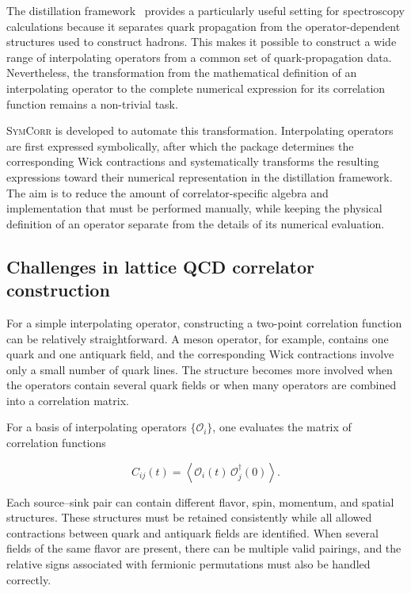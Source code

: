 \documentclass[11pt]{article}
\begin{document}
The distillation framework~\cite{Peardon:2009gh} provides a particularly useful
setting for spectroscopy calculations because it separates quark propagation
from the operator-dependent structures used to construct hadrons. This makes
it possible to construct a wide range of interpolating operators from a common
set of quark-propagation data. Nevertheless, the transformation from the
mathematical definition of an interpolating operator to the complete numerical
expression for its correlation function remains a non-trivial task.

\textsc{SymCorr} is developed to automate this transformation. Interpolating
operators are first expressed symbolically, after which the package determines
the corresponding Wick contractions and systematically transforms the
resulting expressions toward their numerical representation in the
distillation framework. The aim is to reduce the amount of correlator-specific
algebra and implementation that must be performed manually, while keeping the
physical definition of an operator separate from the details of its numerical
evaluation.

\subsection{Challenges in lattice QCD correlator construction}

For a simple interpolating operator, constructing a two-point correlation
function can be relatively straightforward. A meson operator, for example,
contains one quark and one antiquark field, and the corresponding Wick
contractions involve only a small number of quark lines. The structure becomes
more involved when the operators contain several quark fields or when many
operators are combined into a correlation matrix.

For a basis of interpolating operators \(\{\mathcal O_i\}\), one evaluates the
matrix of correlation functions

\begin{equation}
C_{ij}(t)
=
\left\langle
\mathcal O_i(t)\,\mathcal O_j^{\dagger}(0)
\right\rangle .
\end{equation}

Each source--sink pair can contain different flavor, spin, momentum, and
spatial structures. These structures must be retained consistently while all
allowed contractions between quark and antiquark fields are identified. When
several fields of the same flavor are present, there can be multiple valid
pairings, and the relative signs associated with fermionic permutations must
also be handled correctly.
\end{document}
